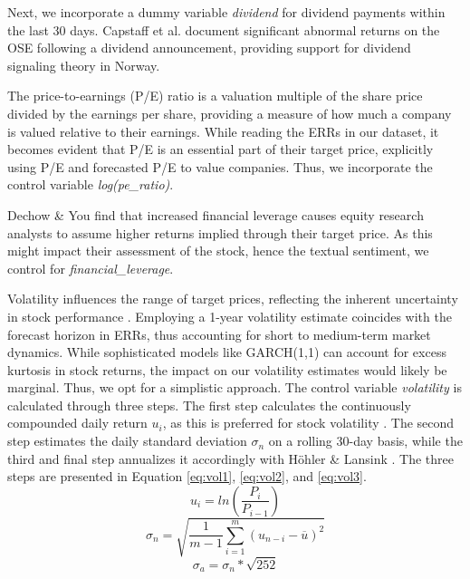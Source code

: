 Next, we incorporate a dummy variable \textit{dividend} for dividend payments within the last 30 days. Capstaff et al. \parencite*{capstaff2004share} document significant abnormal returns on the OSE following a dividend announcement, providing support for dividend signaling theory in Norway. %

The price-to-earnings (P/E) ratio is a valuation multiple of the share price divided by the earnings per share, providing a measure of how much a company is valued relative to their earnings. While reading the ERRs in our dataset, it becomes evident that P/E is an essential part of their target price, explicitly using P/E and forecasted P/E to value companies. Thus, we incorporate the control variable \textit{log(pe\_ratio)}.

Dechow \& You \parencite*{dechow2020understanding} find that increased financial leverage causes equity research analysts to assume higher returns implied through their target price. As this might impact their assessment of the stock, hence the textual sentiment, we control for \textit{financial\_leverage}.

Volatility influences the range of target prices, reflecting the inherent uncertainty in stock performance \parencite{cho2014effect}. Employing a 1-year volatility estimate coincides with the forecast horizon in ERRs, thus accounting for short to medium-term market dynamics. While sophisticated models like GARCH(1,1) can account for excess kurtosis in stock returns, the impact on our volatility estimates would likely be marginal. Thus, we opt for a simplistic approach. The control variable \textit{volatility} is calculated through three steps. The first step calculates the continuously compounded daily return $u_i$, as this is preferred for stock volatility \parencite{investopediaUsingHistorical}. %
The second step estimates the daily standard deviation $\sigma_n$ on a rolling 30-day basis, while the third and final step annualizes it accordingly with Höhler \& Lansink \parencite*{hohler2021measuring}. The three steps are presented in Equation \ref{eq:vol1}, \ref{eq:vol2}, and \ref{eq:vol3}.
\begin{equation}
\label{eq:vol1}
    u_i = ln\left(\frac{P_i}{P_{i-1}}\right)
\end{equation}
\begin{equation}
\label{eq:vol2}
    \sigma_n=\sqrt{\frac{1}{m-1}\sum_{i=1}^{m}(u_{n-i}-\overline{u})^2}
\end{equation}
\begin{equation}
\label{eq:vol3}
    \sigma_{a}=\sigma_{n}*\sqrt{252}
\end{equation}

